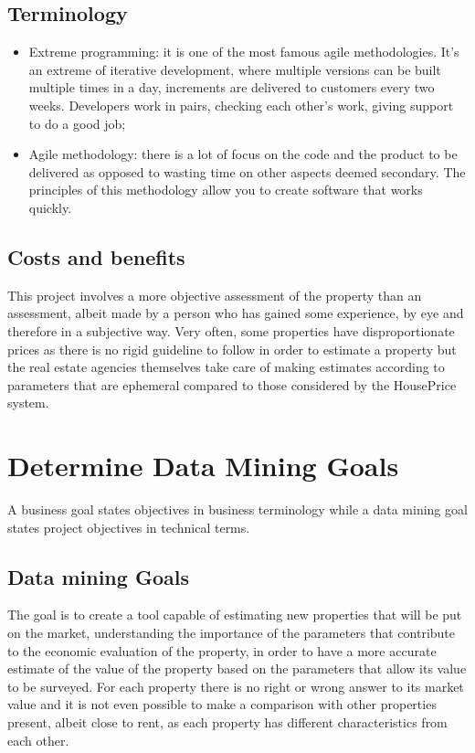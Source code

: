 \subsection{Terminology}
\begin{itemize}
\item Extreme programming: it is one of the most famous agile methodologies. It's an extreme of iterative development, where multiple versions can be built multiple times in a day, increments are delivered to customers every two weeks. Developers work in pairs, checking each other's work, giving support to do a good job; 
\item Agile methodology: there is a lot of focus on the code and the product to be delivered as opposed to wasting time on other aspects deemed secondary. The principles of this methodology allow you to create software that works quickly.
\end{itemize}

\subsection{Costs and benefits}
This project involves a more objective assessment of the property than an assessment, albeit made by a person who has gained some experience, by eye and therefore in a subjective way. Very often, some properties have disproportionate prices as there is no rigid guideline to follow in order to estimate a property but the real estate agencies themselves take care of making estimates according to parameters that are ephemeral compared to those considered by the HousePrice system.



\section{Determine Data Mining Goals}
A business goal states objectives in business terminology while a data mining goal states project objectives in technical terms.

\subsection{Data mining Goals}
The goal is to create a tool capable of estimating new properties that will be put on the market, understanding the importance of the parameters that contribute to the economic evaluation of the property, in order to have a more accurate estimate of the value of the property based on the parameters that allow its value to be surveyed. For each property there is no right or wrong answer to its market value and it is not even possible to make a comparison with other properties present, albeit close to rent, as each property has different characteristics from each other.

